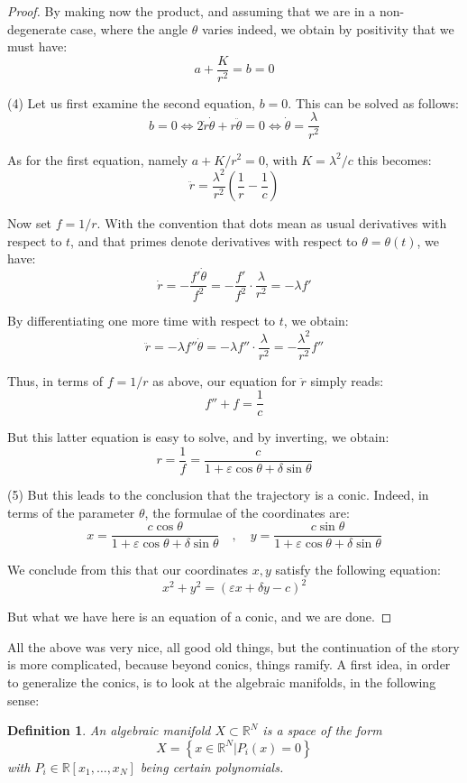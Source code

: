 \documentclass[12pt]{amsbook}
\newtheorem{definition}[theorem]{Definition}
\begin{document}
\begin{proof}
By making now the product, and assuming that we are in a non-degenerate case, where the angle $\theta$ varies indeed, we obtain by positivity that we must have:
$$a+\frac{K}{r^2}=b=0$$

(4) Let us first examine the second equation, $b=0$. This can be solved as follows:
$$b=0
\iff 2\dot{r}\dot{\theta}+r\ddot{\theta}=0
\iff\dot{\theta}=\frac{\lambda}{r^2}$$

As for the first equation, namely $a+K/r^2=0$, with $K=\lambda^2/c$ this becomes:
$$\ddot{r}=\frac{\lambda^2}{r^2}\left(\frac{1}{r}-\frac{1}{c}\right)$$

Now set $f=1/r$. With the convention that dots mean as usual derivatives with respect to $t$, and that primes denote derivatives with respect to $\theta=\theta(t)$, we have:
$$\dot{r}=-\frac{f'\dot{\theta}}{f^2}=-\frac{f'}{f^2}\cdot\frac{\lambda}{r^2}=-\lambda f'$$

By differentiating one more time with respect to $t$, we obtain:
$$\ddot{r}=-\lambda f''\dot{\theta}=-\lambda f''\cdot\frac{\lambda}{r^2}=-\frac{\lambda^2}{r^2}f''$$

Thus, in terms of $f=1/r$ as above, our equation for $\ddot{r}$ simply reads:
$$f''+f=\frac{1}{c}$$

But this latter equation is easy to solve, and by inverting, we obtain:
$$r=\frac{1}{f}=\frac{c}{1+\varepsilon\cos\theta+\delta\sin\theta}$$

(5) But this leads to the conclusion that the trajectory is a conic. Indeed, in terms of the parameter $\theta$, the formulae of the coordinates are:
$$x=\frac{c\cos\theta}{1+\varepsilon\cos\theta+\delta\sin\theta}\quad,\quad 
y=\frac{c\sin\theta}{1+\varepsilon\cos\theta+\delta\sin\theta}$$

We conclude from this that our coordinates $x,y$ satisfy the following equation:
$$x^2+y^2=(\varepsilon x+\delta y-c)^2$$

But what we have here is an equation of a conic, and we are done.
\end{proof}

All the above was very nice, all good old things, but the continuation of the story is more complicated, because beyond conics, things ramify. A first idea, in order to generalize the conics, is to look at the algebraic manifolds, in the following sense:

\begin{definition}
An algebraic manifold $X\subset\mathbb R^N$ is a space of the form
$$X=\left\{x\in\mathbb R^N\Big|P_i(x)=0\right\}$$
with $P_i\in\mathbb R[x_1,\ldots,x_N]$ being certain polynomials.
\end{definition}
\end{document}
